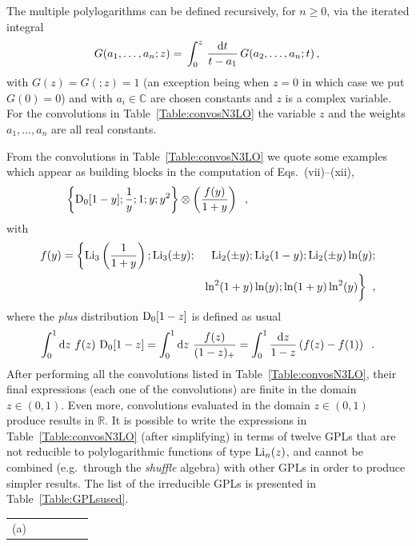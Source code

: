 \documentclass[12pt]{article}
\def\beq{\begin{equation}}
\def\eeq{\end{equation}}
\def\beeq{\begin{eqnarray}}
\def\eeeq{\end{eqnarray}}
\def\nn{\nonumber}
\newcommand\f[2]{\frac{#1}{#2}}
\DeclareRobustCommand{\rd}{\ensuremath{\mathrm{d}}}
\begin{document}
\begin{appendix}
The multiple polylogarithms can be defined recursively, for $n\geq 0$, via the iterated integral~\cite{Goncharov:1998kja,Gehrmann:2000zt,Goncharov:2001iea}
 \beq\label{MultPolyLogdef}
 G(a_1,\ldots,a_n;z)=\,\int_0^z\,\frac{\rd t}{t-a_1}\,G(a_2,\ldots,a_n;t)\,,\\
\eeq
with $G(z) = G(;z)=1$ (an exception being when $z=0$ in which case we put $G(0)=0$) and with $a_i\in \mathbb{C}$ are chosen constants and $z$ is a complex variable. For the convolutions in Table~\ref{Table:convosN3LO} the variable $z$ and the weights $a_1,\ldots,a_n$ are all real constants.

From the convolutions in Table~\ref{Table:convosN3LO} we quote some  examples which appear as building blocks in the computation of Eqs.~(vii)--(xii),
\beeq
\!\!\!\!\!\!\!\!\!\!\!\!&&\!\!\!\!\!\!\!\!\!\!\!\!\!\!\!\!\!\!\!\!\!\!\!\!\!\!\!\!\!\!\!\!\!\!\!\!\!\!\!\!\!\!\!\!\!\!\!\!\bigg\{{\rm D}_{0}[1-y];\f{1}{y};1;y;y^{2}\bigg\} \otimes \left( \f{f(y)}{1+y} \right)\;\;,
\eeeq
with 
\beeq 
f(y)=\bigg\{{\rm Li}_{3}\left(\f{1}{1+y}\right); {\rm Li}_{3}(\pm y);&&\!\!\!\!\!\!\!\!\!{\rm Li}_{2}(\pm y); {\rm Li}_{2}(1- y); {\rm Li}_{2}(\pm y) \ln(y);\nn\\
&&\ln^{2}(1+y)\ln(y);\ln(1+y)\ln^{2}(y)\bigg\}\;\;,
\eeeq
where the \textit{plus} distribution ${\rm D}_{0}[1-z]$ is defined as usual 
\beeq
\int^{1}_{0}\rd z~f(z)~{\rm D}_{0}[1-z] =\int^{1}_{0}\rd z~\f{f(z)}{(1-z)_{+}} = \int^{1}_{0}\f{\rd z}{1-z}\left( f(z)-f(1)\right)\;\;.
\eeeq
After performing all the convolutions listed in Table~\ref{Table:convosN3LO}, their final expressions (each one of the convolutions) are finite in the domain $z\in (0,1)$. Even more, convolutions evaluated in the domain $z\in (0,1)$ produce results in $\mathbb{R}$. It is possible to write the expressions in Table~\ref{Table:convosN3LO} (after simplifying) in terms of twelve GPLs that are not reducible to polylogarithmic functions of type ${\rm Li}_n(z)$, 
 and cannot be combined (e.g.\ through the \textit{shuffle} algebra) with other GPLs in order to produce simpler results. 
The list of the irreducible GPLs is presented in Table~\ref{Table:GPLsused}.
\begin{table}
\begin{center}
\renewcommand{\arraystretch}{1.5}
\begin{tabular}{ |c|c||c|c||c|c| }
\hline
\multirow{1}{*}{(a)} 


\end{tabular}
\end{center}
\end{table}
\end{appendix}
\end{document}
